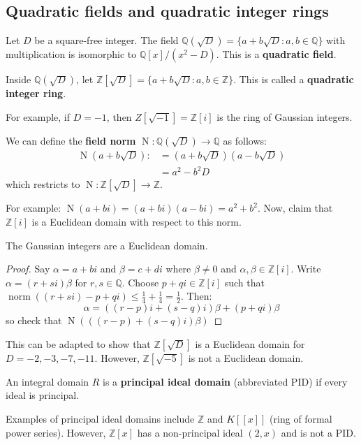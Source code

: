 \documentclass{article}
\theoremstyle{plain}
\newcommand{\Q}{\mathbb{Q}}
\newcommand{\Z}{\mathbb{Z}}
\newcommand{\on}[1]{\operatorname{#1}}
\begin{document}
\subsection{Quadratic fields and quadratic integer rings}
	\begin{definition}{}{}
		Let $D$ be a square-free integer. The field $\Q(\sqrt{D}) = \{ a+b\sqrt{D} : a,b\in \Q \}$ with multiplication is isomorphic to $\Q[x]/(x^2-D)$. This is a \textbf{quadratic field}.
	\end{definition}
	\begin{definition}{}{}
		Inside $\Q(\sqrt{D})$, let $\Z[\sqrt{D}] = \{ a+b\sqrt{D} : a,b \in \Z \}$. This is called a \textbf{quadratic integer ring}.
	\end{definition}
	For example, if $D = -1$, then $Z[\sqrt{-1}] = \Z[i]$ is the ring of Gaussian integers.
	\begin{definition}{}{}
		We can define the \textbf{field norm} $\on{N} : \Q(\sqrt{D}) \to \Q$ as follows:
		\begin{align*}\on{N}(a+b\sqrt{D}) :&= (a+b\sqrt{D})(a-b\sqrt{D}) \\
		&=a^2-b^2D
		\end{align*}
		which restricts to $\on{N} : \Z[\sqrt{D}] \to \Z$.
	\end{definition}
	For example: $\on{N}(a+bi) = (a+bi)(a-bi) = a^2+b^2$. Now, claim that $\Z[i]$ is a Euclidean domain with respect to this norm.
	\begin{theorem}{}{}
		The Gaussian integers are a Euclidean domain.
	\end{theorem}
	\begin{proof}
		Say $\alpha = a+bi$ and $\beta = c+di$ where $\beta \ne 0$ and $\alpha,\beta \in \Z[i]$. Write $\alpha = (r+si)\beta$ for $r,s \in \Q$. Choose $p+qi \in \Z[i]$ such that $\on{norm}((r+si) - p+qi) \le \frac{1}{4} + \frac{1}{4} = \frac{1}{2}$. Then:
			$$\alpha = ((r-p)i + (s-q)i)\beta + (p+qi)\beta$$
		so check that $\on{N}(((r-p) + (s-q)i)\beta)$
	\end{proof}
	This can be adapted to show that $\Z[\sqrt{D}]$ is a Euclidean domain for $D = -2,-3,-7,-11$. However, $\Z[\sqrt{-5}]$ is not a Euclidean domain.
	\begin{definition}{}{}
	An integral domain $R$ is a \textbf{principal ideal domain} (abbreviated PID) if every ideal is principal.	
	\end{definition}
	Examples of principal ideal domains include $\Z$ and $K[[x]]$ (ring of formal power series). However, $\Z[x]$ has a non-principal ideal $(2,x)$ and is not a PID.
\end{document}
